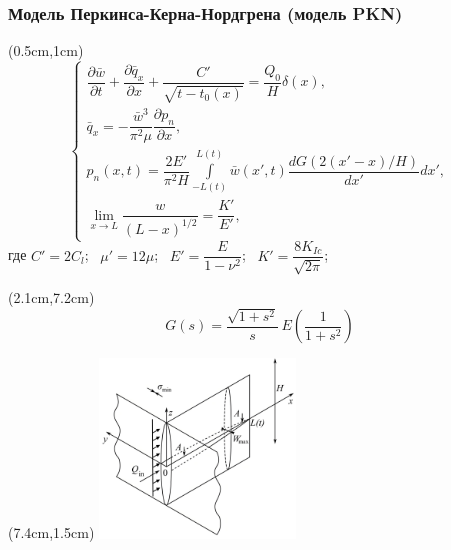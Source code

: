 \documentclass{beamer}
\begin{document}

\begin{frame}
\frametitle{Модель Перкинса-Керна-Нордгрена (модель PKN)}

\scriptsize

\begin{textblock*}{7cm}(0.5cm,1cm)
$$
\begin{cases}
\dfrac{\partial\bar{w}}{\partial t}+\dfrac{\partial\bar{q}_x}{\partial x}+\dfrac{C'}{\sqrt{t-t_0(x)}}=\dfrac{Q_0}{H}\delta(x),\\[15pt]
\bar{q}_x=-\dfrac{\bar{w}^3}{\pi^2\mu}\dfrac{\partial p_n}{\partial x},\\[15pt]
p_n(x,t)=\dfrac{2E'}{\pi^2H}\displaystyle\int\limits_{-L(t)}^{L(t)}\bar{w}(x',t)\dfrac{dG(2(x'-x)/H)}{dx'}dx',\\[22pt]
\displaystyle\lim_{x\to L}\dfrac{w}{(L-x)^{1/2}}=\dfrac{K'}{E'},
\end{cases}
$$
где $C'=2C_l$; $\,\,\,\mu'=12\mu$; $\,\,\,E'=\dfrac{E}{1-\nu^2}$; $\,\,\,K'=\dfrac{8K_{Ic}}{\sqrt{2\pi}}$;
\end{textblock*}

\begin{textblock*}{7cm}(2.1cm,7.2cm)
$$
G(s)=\frac{\sqrt{1+s^2}}{s}\,E\!\left(\frac{1}{1+s^2}\right)
$$
\end{textblock*}

\begin{textblock*}{7cm}(7.4cm,1.5cm)
\includegraphics[width=5.2cm]{pkn_model_3D.jpg}
\end{textblock*}


\end{frame}
\end{document}
